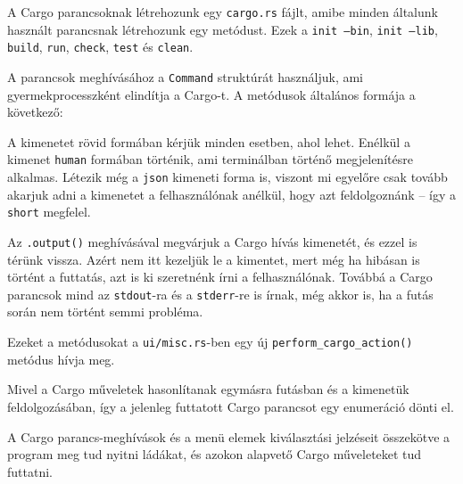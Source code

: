 
A Cargo parancsoknak létrehozunk egy \texttt{cargo.rs} fájlt, amibe minden általunk használt
parancsnak létrehozunk egy metódust.
Ezek a \texttt{init --bin}, \texttt{init --lib}, \texttt{build}, \texttt{run}, \texttt{check}, \texttt{test} és \texttt{clean}.

A parancsok meghívásához a \texttt{Command} struktúrát használjuk, ami gyermekprocesszként elindítja a Cargo-t.
A metódusok általános formája a következő:



A kimenetet rövid formában kérjük minden esetben, ahol lehet.
Enélkül a kimenet \texttt{human} formában történik, ami terminálban történő megjelenítésre alkalmas.
Létezik még a \texttt{json} kimeneti forma is, viszont mi egyelőre csak tovább akarjuk adni a kimenetet
a felhasználónak anélkül, hogy azt feldolgoznánk -- így a \texttt{short} megfelel.

Az \texttt{.output()} meghívásával megvárjuk a Cargo hívás kimenetét, és ezzel is térünk vissza.
Azért nem itt kezeljük le a kimentet, mert még ha hibásan is történt a futtatás,
azt is ki szeretnénk írni a felhasználónak.
Továbbá a Cargo parancsok mind az \texttt{stdout}-ra és a \texttt{stderr}-re is írnak,
még akkor is, ha a futás során nem történt semmi probléma.

Ezeket a metódusokat a \texttt{ui/misc.rs}-ben egy új \texttt{perform\_cargo\_action()}
metódus hívja meg.



Mivel a Cargo műveletek hasonlítanak egymásra futásban és a kimenetük feldolgozásában,
így a jelenleg futtatott Cargo parancsot egy enumeráció dönti el.

A Cargo parancs-meghívások és a menü elemek kiválasztási jelzéseit összekötve a
program meg tud nyitni ládákat, és azokon alapvető Cargo műveleteket tud futtatni.